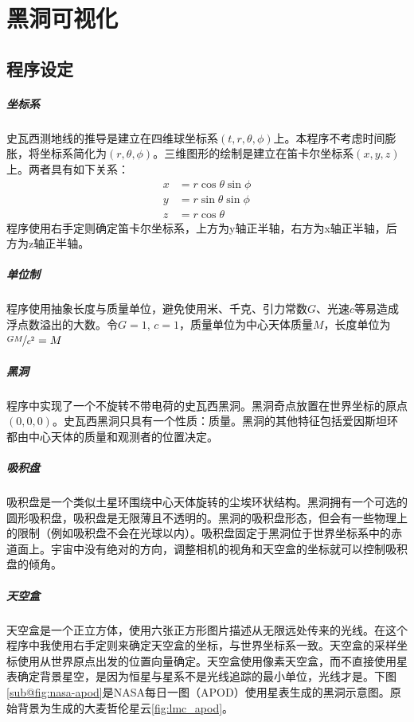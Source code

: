 \chapter{黑洞可视化}

\section{程序设定}
\paragraph{坐标系}
史瓦西测地线的推导是建立在四维球坐标系$\left(t,r,\theta,\phi\right)$上。本程序不考虑时间膨胀，将坐标系简化为$\left(r,\theta,\phi\right)$。三维图形的绘制是建立在笛卡尔坐标系$\left(x,y,z\right)$上。两者具有如下关系：
\begin{equation}
    \begin{split}
        x&=r\cos\theta\sin\phi\\
        y&=r\sin\theta\sin\phi\\
        z&=r\cos\theta
    \end{split}
\end{equation}
程序使用右手定则确定笛卡尔坐标系，上方为y轴正半轴，右方为x轴正半轴，后方为z轴正半轴。

\paragraph{单位制}
程序使用抽象长度与质量单位，避免使用米、千克、引力常数$G$、光速$c$等易造成浮点数溢出的大数。令$G=1$, $c=1$，质量单位为中心天体质量$M$，长度单位为$\nicefrac{GM}{c^2}=M$
\paragraph{黑洞}程序中实现了一个不旋转不带电荷的史瓦西黑洞。黑洞奇点放置在世界坐标的原点$\left(0,0,0\right)$。史瓦西黑洞只具有一个性质：质量。黑洞的其他特征包括爱因斯坦环都由中心天体的质量和观测者的位置决定。
\paragraph{吸积盘}吸积盘是一个类似土星环围绕中心天体旋转的尘埃环状结构。黑洞拥有一个可选的圆形吸积盘，吸积盘是无限薄且不透明的。黑洞的吸积盘形态，但会有一些物理上的限制（例如吸积盘不会在光球以内）。吸积盘固定于黑洞位于世界坐标系中的赤道面上。宇宙中没有绝对的方向，调整相机的视角和天空盒的坐标就可以控制吸积盘的倾角。
\paragraph{天空盒}
天空盒是一个正立方体，使用六张正方形图片描述从无限远处传来的光线。在这个程序中我使用右手定则来确定天空盒的坐标，与世界坐标系一致。天空盒的采样坐标使用从世界原点出发的位置向量确定。天空盒使用像素天空盒，而不直接使用星表确定背景星空，是因为恒星与星系不是光线追踪的最小单位，光线才是。下图\ref{sub@fig:nasa-apod}是NASA每日一图（APOD）\cite{raytraceusingstarcatalogue}使用星表生成的黑洞示意图。原始背景为生成的大麦哲伦星云\ref{fig:lmc_apod}。

